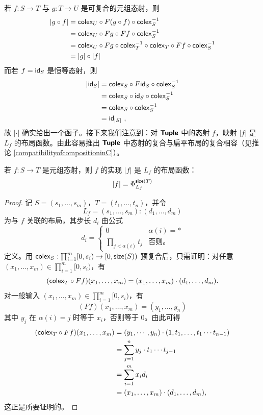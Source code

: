 \noindent 若 $f:S \to T$ 与 $g:T \to U$ 是可复合的元组态射，则
\begin{align*}
    |g \circ f| & = \mathsf{colex}_U \circ F(g \circ f) \circ \mathsf{colex}_S^{-1}\\
    & = \mathsf{colex}_U \circ Fg \circ Ff \circ \mathsf{colex}_S^{-1} \\
    & = \mathsf{colex}_U \circ Fg \circ \mathsf{colex}_T^{-1} \circ \mathsf{colex}_T \circ Ff \circ \mathsf{colex}_S^{-1} \\
    & = |g| \circ |f|
\end{align*}
而若 $f = \mathsf{id}_S$ 是恒等态射，则
\begin{align*}
|\mathsf{id}_S| & = \mathsf{colex}_S \circ F \mathsf{id}_S \circ \mathsf{colex}_S^{-1}\\
& = \mathsf{colex}_S \circ \mathsf{id}_{S} \circ \mathsf{colex}_S^{-1}\\
& = \mathsf{colex}_S \circ \mathsf{colex}_S^{-1}\\
& = \mathsf{id}_{|S|}
~,
\end{align*}
故 $| \cdot |$ 确实给出一个函子。接下来我们注意到：对 ${\boldsymbol{\mathsf{Tuple}}}$ 中的态射 $f$，映射 $|f|$ 是 $L_f$ 的布局函数。由此容易推出 ${\boldsymbol{\mathsf{Tuple}}}$ 中态射的复合与扁平布局的复合相容（见推论 \ref{compatibilityofcompositioninC}）。

\begin{lemma} \label{layoutfunctionlemma}
    若 $f:S \to T$ 是元组态射，则 $f$ 的实现 $|f|$ 是 $L_f$ 的布局函数：
    \[ |f| = \Phi_{L_f}^{\mathsf{size}(T)}
    \]
\end{lemma}

\begin{proof}
    记 $S = (s_1,\dots,s_m)$，$T = (t_1,\dots,t_n)$，并令
    \[L_f = (s_1,\dots,s_m):(d_1,\dots,d_m)\]
    为与 $f$ 关联的布局，其步长 $d_i$ 由公式
    \[d_i = \begin{cases}
0 & \alpha(i) = * \\
\prod_{j < \alpha(i)} t_j & \text{否则。}
\end{cases}
\]
    定义。用 $\mathsf{colex}_S:\prod_{i=1}^m[0,s_i) \to [0,\mathsf{size}(S))$ 预复合后，只需证明：对任意 $(x_1,\dots,x_m) \in \prod_{i=1}^m [0,s_i)$，有
    \[(\mathsf{colex}_T \circ Ff) (x_1,\dots,x_m) = (x_1,\dots,x_m) \cdot (d_1,\dots,d_m).\]
    对一般输入 $(x_1,\dots,x_m) \in \prod_{i=1}^m [0,s_i)$，有
    \[
    (Ff) (x_1,\dots,x_m) = (y_1,\dots,y_n)
    \]
    其中 $y_j$ 在 $\alpha(i) = j$ 时等于 $x_i$，否则等于 $0$。由此可得
    \begin{align*}
    (\mathsf{colex}_T \circ Ff)(x_1,\dots,x_m) & = (y_1, \cdots ,y_n) \cdot (1,t_1 , \dots, t_1 \cdots t_{n-1}) \\
    & = \sum_{j=1}^n y_j \cdot t_1 \cdots t_{j-1} \\
    & = \sum_{i=1}^m x_i d_i \\
    & = (x_1,\dots,x_m) \cdot (d_1,\dots,d_m),
    \end{align*}
    这正是所要证明的。
\end{proof}




